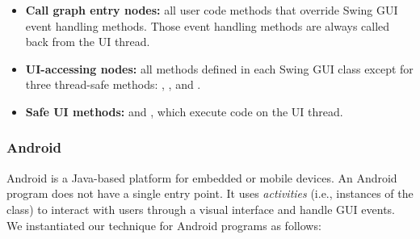 \begin{myindentpar}{-2mm}
\begin{itemize}
\tinystep

\item \textbf{Call graph entry nodes:} all user code methods that override
Swing GUI event handling methods. Those event handling methods are always
called back from the UI thread.

\tinystep

\item \textbf{UI-accessing nodes:} %
all methods defined in each Swing GUI class except for three thread-safe
methods: , , and .

\tinystep

\item \textbf{Safe UI methods: } 
 and , which execute code on the UI thread.

\end{itemize}
\end{myindentpar}

\smallstep

\tinystep
\subsubsection{Android}

Android is a Java-based platform for embedded or mobile devices. 
An Android program does not have a single entry point.
It uses \textit{activities}
(i.e., instances of the  class)
to interact with users through a visual interface and handle GUI events.
We instantiated our technique for Android programs as follows:


